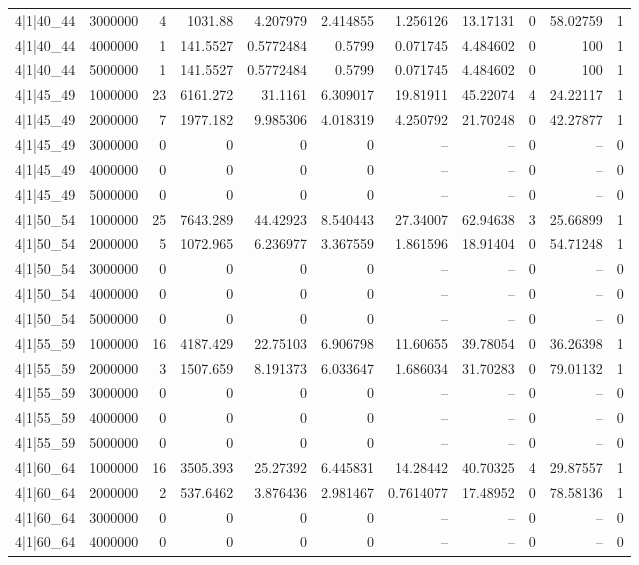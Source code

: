 \begin{tabular}{lrrrrrrrrrr}
4|1|40\_44 & 3000000 & 4 & 1031.88 & 4.207979 & 2.414855 & 1.256126 & 13.17131 & 0 & 58.02759 & 1 \\
4|1|40\_44 & 4000000 & 1 & 141.5527 & 0.5772484 & 0.5799 & 0.071745 & 4.484602 & 0 & 100 & 1 \\
4|1|40\_44 & 5000000 & 1 & 141.5527 & 0.5772484 & 0.5799 & 0.071745 & 4.484602 & 0 & 100 & 1 \\
4|1|45\_49 & 1000000 & 23 & 6161.272 & 31.1161 & 6.309017 & 19.81911 & 45.22074 & 4 & 24.22117 & 1 \\
4|1|45\_49 & 2000000 & 7 & 1977.182 & 9.985306 & 4.018319 & 4.250792 & 21.70248 & 0 & 42.27877 & 1 \\
4|1|45\_49 & 3000000 & 0 & 0 & 0 & 0 & -- & -- & 0 & -- & 0 \\
4|1|45\_49 & 4000000 & 0 & 0 & 0 & 0 & -- & -- & 0 & -- & 0 \\
4|1|45\_49 & 5000000 & 0 & 0 & 0 & 0 & -- & -- & 0 & -- & 0 \\
4|1|50\_54 & 1000000 & 25 & 7643.289 & 44.42923 & 8.540443 & 27.34007 & 62.94638 & 3 & 25.66899 & 1 \\
4|1|50\_54 & 2000000 & 5 & 1072.965 & 6.236977 & 3.367559 & 1.861596 & 18.91404 & 0 & 54.71248 & 1 \\
4|1|50\_54 & 3000000 & 0 & 0 & 0 & 0 & -- & -- & 0 & -- & 0 \\
4|1|50\_54 & 4000000 & 0 & 0 & 0 & 0 & -- & -- & 0 & -- & 0 \\
4|1|50\_54 & 5000000 & 0 & 0 & 0 & 0 & -- & -- & 0 & -- & 0 \\
4|1|55\_59 & 1000000 & 16 & 4187.429 & 22.75103 & 6.906798 & 11.60655 & 39.78054 & 0 & 36.26398 & 1 \\
4|1|55\_59 & 2000000 & 3 & 1507.659 & 8.191373 & 6.033647 & 1.686034 & 31.70283 & 0 & 79.01132 & 1 \\
4|1|55\_59 & 3000000 & 0 & 0 & 0 & 0 & -- & -- & 0 & -- & 0 \\
4|1|55\_59 & 4000000 & 0 & 0 & 0 & 0 & -- & -- & 0 & -- & 0 \\
4|1|55\_59 & 5000000 & 0 & 0 & 0 & 0 & -- & -- & 0 & -- & 0 \\
4|1|60\_64 & 1000000 & 16 & 3505.393 & 25.27392 & 6.445831 & 14.28442 & 40.70325 & 4 & 29.87557 & 1 \\
4|1|60\_64 & 2000000 & 2 & 537.6462 & 3.876436 & 2.981467 & 0.7614077 & 17.48952 & 0 & 78.58136 & 1 \\
4|1|60\_64 & 3000000 & 0 & 0 & 0 & 0 & -- & -- & 0 & -- & 0 \\
4|1|60\_64 & 4000000 & 0 & 0 & 0 & 0 & -- & -- & 0 & -- & 0 \\

\end{tabular}
